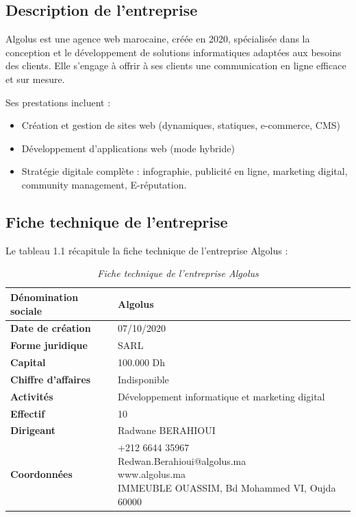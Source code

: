 \documentclass[12pt,a4paper]{report}
\begin{document}
	\subsection{Description de l’entreprise}
	
	Algolus est une agence web marocaine, créée en 2020, spécialisée dans la conception et le développement de solutions informatiques adaptées aux besoins des clients. Elle s'engage à offrir à ses clients une communication en ligne efficace et sur mesure.

	Ses prestations incluent :
	
	\renewcommand{\labelitemi}{$\bullet$}
	\begin{itemize}
		\item Création et gestion de sites web (dynamiques, statiques, e-commerce, CMS)
		\item Développement d'applications web (mode hybride)
		\item Stratégie digitale complète : infographie, publicité en ligne, marketing digital, community management, E-réputation.
	\end{itemize}
	
	\subsection{Fiche technique de l'entreprise}
	
	Le tableau 1.1 récapitule la fiche technique de l'entreprise Algolus :
	
	\begin{table}[htbp]
		\centering
		\caption{\textit{Fiche technique de l'entreprise Algolus}}
		\begin{tabular}{|l|l|}
			\hline
			\textbf{Dénomination sociale} & Algolus \\
			\hline
			\textbf{Date de création} & 07/10/2020 \\
			\hline
			\textbf{Forme juridique} & SARL \\
			\hline
			\textbf{Capital} & 100.000 Dh \\
			\hline
			\textbf{Chiffre d'affaires} & Indisponible \\
			\hline
			\textbf{Activités} & Développement informatique et marketing digital \\
			\hline
			\textbf{Effectif} & 10 \\
			\hline
			\textbf{Dirigeant} & Radwane BERAHIOUI \\
			\hline
			\textbf{Coordonnées} & \makecell[l]{+212 6644 35967 \\ Redwan.Berahioui@algolus.ma \\ www.algolus.ma \\ IMMEUBLE OUASSIM, Bd Mohammed VI, Oujda 60000} \\
			\hline
		\end{tabular}
		\label{tab:fiche-technique-algolus}  %
	\end{table}
	
\end{document}
